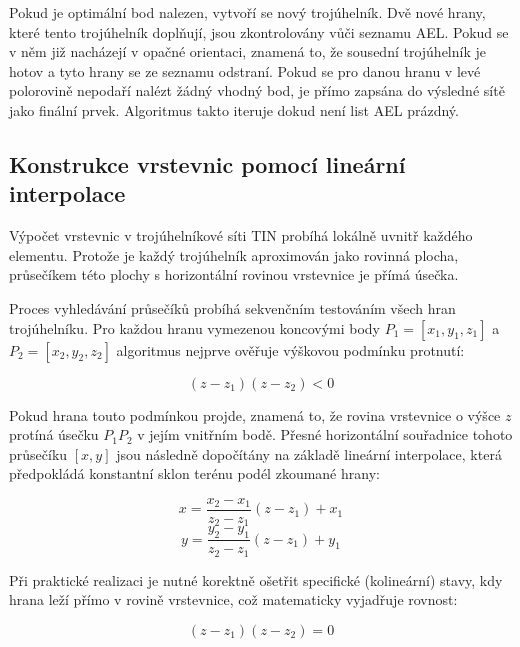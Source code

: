 \documentclass[9pt, a4paper]{article}
\begin{document}
\vspace{0.3 cm}
\noindent Pokud je optimální bod nalezen, vytvoří se nový trojúhelník. Dvě nové hrany, které tento trojúhelník doplňují, jsou zkontrolovány vůči seznamu AEL. Pokud se v něm již nacházejí v opačné orientaci, znamená to, že sousední trojúhelník je hotov a tyto hrany se ze seznamu odstraní. Pokud se pro danou hranu v levé polorovině nepodaří nalézt žádný vhodný bod, je přímo zapsána do výsledné sítě jako finální prvek. Algoritmus takto iteruje dokud není list AEL prázdný.

\newpage
\subsection*{Konstrukce vrstevnic pomocí lineární interpolace}
\vspace{0.3 cm}
\noindent Výpočet vrstevnic v trojúhelníkové síti TIN probíhá lokálně uvnitř každého elementu. Protože je každý trojúhelník aproximován jako rovinná plocha, průsečíkem této plochy s horizontální rovinou vrstevnice je přímá úsečka.

\vspace{0.3 cm}
\noindent Proces vyhledávání průsečíků probíhá sekvenčním testováním všech hran trojúhelníku. Pro každou hranu vymezenou koncovými body $P_1 = [x_1, y_1, z_1]$ a $P_2 = [x_2, y_2, z_2]$ algoritmus nejprve ověřuje výškovou podmínku protnutí:

\vspace{0.3 cm}
$$(z - z_1)(z - z_2) < 0$$

\vspace{0.3 cm}
\noindent Pokud hrana touto podmínkou projde, znamená to, že rovina vrstevnice o výšce $z$ protíná úsečku $P_1P_2$ v jejím vnitřním bodě. Přesné horizontální souřadnice tohoto průsečíku $[x, y]$ jsou následně dopočítány na základě lineární interpolace, která předpokládá konstantní sklon terénu podél zkoumané hrany:

\vspace{0.3 cm}
$$x = \frac{x_2 - x_1}{z_2 - z_1}(z - z_1) + x_1$$
\vspace{0.3 cm}
$$y = \frac{y_2 - y_1}{z_2 - z_1}(z - z_1) + y_1$$

\vspace{0.3 cm}
\noindent Při praktické realizaci je nutné korektně ošetřit specifické (kolineární) stavy, kdy hrana leží přímo v rovině vrstevnice, což matematicky vyjadřuje rovnost:

\vspace{0.3 cm}
$$(z - z_1)(z - z_2) = 0$$
\end{document}
